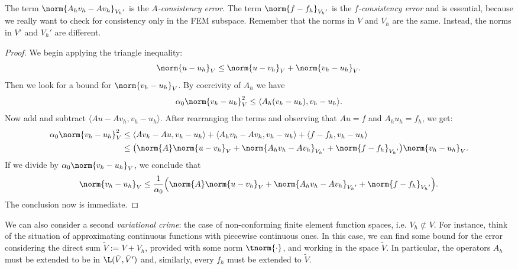 \begin{remark}
The term $\norm{A_h v_h - A v_h}_{{V_h}'}$ is the \emph{$A$-consistency error}. The term $\norm{f-f_h}_{{V_h}'}$ is the \emph{$f$-consistency error} and is essential, because we really want to check for consistency only in the FEM subspace.
Remember that the norms in $V$ and $V_h$ are the same. Instead, the norms in $V'$ and ${V_h}'$ are different.

\end{remark}

\begin{proof}
We begin applying the triangle inequality:
\[
\norm{u-u_h}_V \le \norm{u-v_h}_V + \norm{v_h - u_h}_V.
\]
Then we look for a bound for $\norm{v_h - u_h}_V$. By coercivity of $A_h$ we have
\[
\alpha_0 \norm{v_h - u_h}_V^2 \le \langle A_h(v_h - u_h), v_h- u_h \rangle.
\]
Now add and subtract $\langle A u - A v_h, v_h- u_h \rangle$. After rearranging the terms and observing that $Au = f$ and $A_h u_h = f_h$, we get:
\begin{align}
\alpha_0 \norm{v_h - u_h}_V^2 &\le  \langle A v_h - A u, v_h- u_h \rangle +
\langle A_h v_h - A v_h, v_h- u_h \rangle + \langle f - f_h, v_h- u_h \rangle \\
& \le \bigl( \norm{A} \norm{u-v_h}_V + \norm{A_h v_h - A v_h}_{{V_h}'} + \norm{f - f_h}_{{V_h}'} \bigr)
\norm{v_h - u_h}_V.
\end{align}
If we divide by $\alpha_0 \norm{v_h - u_h}_V$, we conclude that
\[
\norm{v_h - u_h}_V\le \frac{1}{\alpha_0} \Bigl( \norm{A} \norm{u-v_h}_V + \norm{A_h v_h - A v_h}_{{V_h}'} + \norm{f - f_h}_{{V_h}'} \Bigr).
\]
The conclusion now is immediate. 
\end{proof}

We can also consider a second \emph{variational crime}: the case of non-conforming finite element function spaces, i.e. $V_h \not\subset V$. For instance, think of the situation of approximating continuous functions with piecewise continuous ones. 
In this case, we can find some bound for the error considering the direct sum $\tilde{V} := V + V_h$, provided with some norm $\tnorm{\cdot}$, and working in the space $\tilde{V}$. In particular, the operators $A_h$ must be extended to be in $\L(\tilde{V},\tilde{V}')$ and, similarly, every $f_h$ must be extended to $\tilde{V}$.

